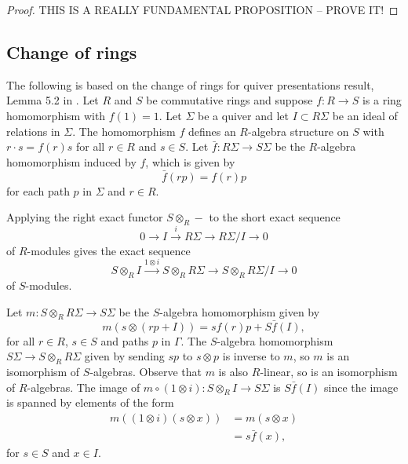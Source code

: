 \documentclass[a4paper, 11pt]{report}
\begin{document}
\begin{proof}
{\color{red}THIS IS A REALLY FUNDAMENTAL PROPOSITION -- PROVE IT!}
\end{proof}


\subsection{Change of rings}

The following is based on the change of rings for quiver presentations result, Lemma 5.2 in \cite{su12}. Let $R$ and $S$ be commutative rings and suppose $f\colon R\to S$ is a ring homomorphism with $f(1)=1$. Let $\Sigma$ be a quiver and let $I\subset R\Sigma$ be an ideal of relations in $\Sigma$. The homomorphism $f$ defines an $R$-algebra structure on $S$ with $r\cdot s = f(r)s$ for all $r\in R$ and $s\in S$. Let $\bar{f}\colon R\Sigma\to S\Sigma$ be the $R$-algebra homomorphism induced by $f$, which is given by
\begin{equation*}
\bar{f}(rp)=f(r)p
\end{equation*}
for each path $p$ in $\Sigma$ and $r\in R$.

Applying the right exact functor $S\otimes_R -$ to the short exact sequence
\begin{equation*}
0\to I \overset{i}\to R\Sigma \to R\Sigma/{I} \to 0
\end{equation*}
of $R$-modules gives the exact sequence
\begin{equation*}
S\otimes_R I \overset{1\otimes i}\to S\otimes_R R\Sigma \to S\otimes_R R\Sigma/{I} \to 0
\end{equation*}
of $S$-modules.

Let $m\colon S\otimes_R R\Sigma\to S\Sigma$ be the $S$-algebra homomorphism given by
\begin{equation*}
m(s\otimes (rp+I)) = sf(r)p + S\bar{f}{(I)},
\end{equation*}
for all $r\in R$, $s\in S$ and paths $p$ in $\Gamma$. The $S$-algebra homomorphism $S\Sigma\to S\otimes_R R\Sigma$ given by sending $sp$ to $s\otimes p$ is inverse to $m$, so $m$ is an isomorphism of $S$-algebras. Observe that $m$ is also $R$-linear, so is an isomorphism of $R$-algebras. The image of $m\circ (1\otimes i)\colon S\otimes_R I \to S\Sigma$ is $S\bar{f}{(I)}$ since the image is spanned by elements of the form
\begin{align*}
m((1\otimes i)(s\otimes x))
&= m(s\otimes x)\\
&= s\bar{f}{(x)},
\end{align*}
for $s\in S$ and $x\in I$.
\end{document}

